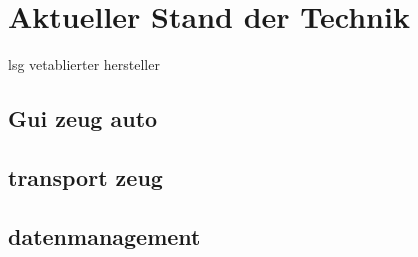 \chapter{Aktueller Stand der Technik}
lsg vetablierter hersteller
\section{Gui zeug auto}
\section{transport zeug}
\section{datenmanagement}